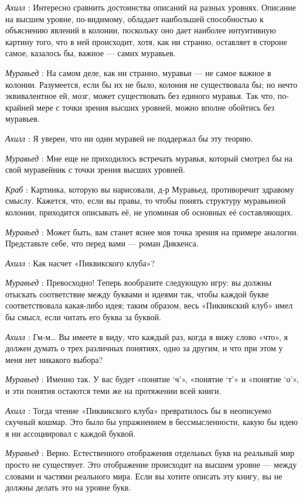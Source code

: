 \documentclass[../main.tex]{subfiles}
\begin{document}
\begin{dialogue}
\emph{Ахилл} : Интересно сравнить достоинства описаний на разных уровнях. Описание на высшем уровне, по-видимому, обладает наибольшей способностью к объяснению явлений в колонии, поскольку оно дает наиболее интуитивную картину того, что в ней происходит, хотя, как ни странно, оставляет в стороне самое, казалось бы, важное --- самих муравьев.

\emph{Муравьед} : На самом деле, как ни странно, муравьи --- не самое важное в колонии. Разумеется, если бы их не было, колония не существовала бы; но нечто эквивалентное ей, мозг, может существовать без единого муравья. Так что, по-крайней мере с точки зрения высших уровней, можно вполне обойтись без муравьев.

\emph{Ахилл} : Я уверен, что ни один муравей не поддержал бы эту теорию.

\emph{Муравьед} : Мне еще не приходилось встречать муравья, который смотрел бы на свой муравейник с точки зрения высших уровней.

\emph{Краб} : Картинка, которую вы нарисовали, д-р Муравьед, противоречит здравому смыслу. Кажется, что, если вы правы, то чтобы понять структуру муравьиной колонии, приходится описывать её, не упоминая об основных её составляющих.

\emph{Муравьед} : Может быть, вам станет яснее моя точка зрения на примере аналогии. Представьте себе, что перед вами --- роман Диккенса.

\emph{Ахилл} : Как насчет «Пиквикского клуба»?

\emph{Муравьед} : Превосходно! Теперь вообразите следующую игру: вы должны отыскать соответствие между буквами и идеями так, чтобы каждой букве соответствовала какая-либо идея; таким образом, весь «Пиквикский клуб» имел бы смысл, если читать его буква за буквой.

\emph{Ахилл} : Гм-м\ldots{} Вы имеете в виду, что каждый раз, когда я вижу слово «что», я должен думать о трех различных понятиях, одно за другим, и что при этом у меня нет никакого выбора?

\emph{Муравьед} : Именно так. У вас будет «понятие \enquote*{ч}», «понятие \enquote*{т}» и «понятие \enquote*{о}», и эти понятия остаются теми же на протяжении всей книги.

\emph{Ахилл} : Тогда чтение «Пиквикского клуба» превратилось бы в неописуемо скучный кошмар. Это было бы упражнением в бессмысленности, какую бы идею я ни ассоциировал с каждой буквой.

\emph{Муравьед} : Верно. Естественного отображения отдельных букв на реальный мир просто не существует. Это отображение происходит на высшем уровне --- между словами и частями реального мира. Если вы хотите описать эту книгу, вы не должны делать это на уровне букв.


\end{dialogue}
\end{document}
